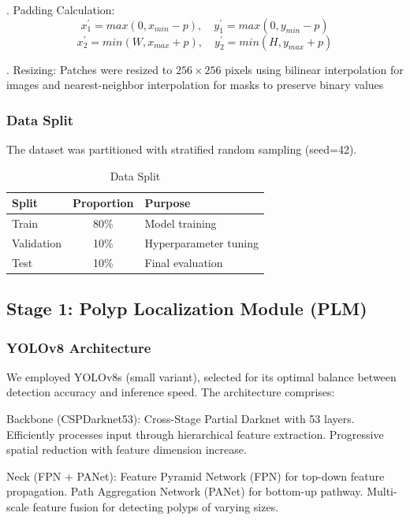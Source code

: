 \documentclass[runningheads]{llncs}
\begin{document}
. Padding Calculation:
\begin{equation}
x_{1}^{\prime}=max(0,x_{min}-p), \quad y_{1}^{\prime}=max(0,y_{min}-p)
\end{equation}
\begin{equation}
x_{2}^{\prime}=min(W,x_{max}+p), \quad y_{2}^{\prime}=min(H,y_{max}+p)
\end{equation}

. Resizing: Patches were resized to $256\times256$ pixels using bilinear interpolation for images and nearest-neighbor interpolation for masks to preserve binary values

\subsubsection{Data Split}
The dataset was partitioned with stratified random sampling (seed=42).

\begin{table}[H]
\caption{Data Split}
\label{tab:data_split}
\centering
\begin{tabular}{lcl}
\toprule
\textbf{Split} & \textbf{Proportion} & \textbf{Purpose} \\
\midrule
Train & 80\% & Model training \\
Validation & 10\% & Hyperparameter tuning \\
Test & 10\% & Final evaluation \\
\bottomrule
\end{tabular}
\end{table}

\subsection{Stage 1: Polyp Localization Module (PLM)}

\subsubsection{YOLOv8 Architecture}
We employed YOLOv8s (small variant), selected for its optimal balance between detection accuracy and inference speed. The architecture comprises:

\noindent Backbone (CSPDarknet53): Cross-Stage Partial Darknet with 53 layers. Efficiently processes input through hierarchical feature extraction. Progressive spatial reduction with feature dimension increase.

\noindent Neck (FPN + PANet): Feature Pyramid Network (FPN) for top-down feature propagation. Path Aggregation Network (PANet) for bottom-up pathway. Multi-scale feature fusion for detecting polyps of varying sizes.
\end{document}
